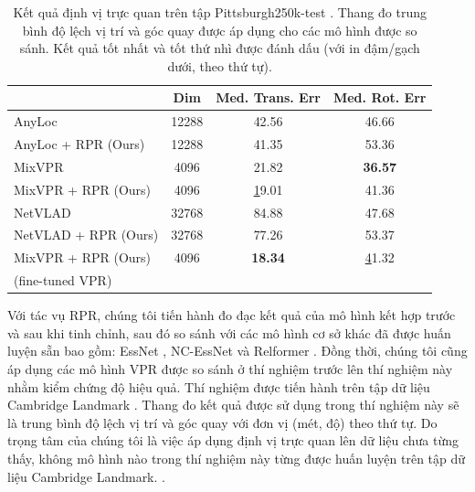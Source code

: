 \bgroup
\def\arraystretch{1.4}%
\setlength\tabcolsep{10 pt}
\begin{table}[H]
\centering
\begin{tabular}{|l|c|c|c|}
\hline
                                & Dim   & Med. Trans. Err & Med. Rot. Err \\ \hline
AnyLoc \cite{keetha2023anyloc}  & 12288 & 42.56           & 46.66         \\
AnyLoc + RPR (Ours)             & 12288 & 41.35           & 53.36         \\ \hline
MixVPR \cite{alibey2023mixvpr}  & 4096  & 21.82           & \textbf{36.57}\\
MixVPR + RPR (Ours)             & 4096  & {\ul 19.01}     & 41.36         \\ \hline
NetVLAD \cite{arandjelovic2016netvlad} & 32768 & 84.88             & 47.68           \\
NetVLAD + RPR (Ours)            & 32768 & 77.26           & 53.37         \\ \hline
MixVPR + RPR (Ours)             & 4096  &\textbf{18.34}   & {\ul 41.32}   \\
(fine-tuned VPR)                &       &                 &               \\ \hline
\end{tabular}
\vspace{10pt}
\caption[Kết quả định vị trực quan trên tập Pittsburgh250k-test]{Kết quả định vị trực quan trên tập Pittsburgh250k-test \cite{6618963}. Thang đo trung bình độ lệch vị trí và góc quay được áp dụng cho các mô hình được so sánh. Kết quả tốt nhất và tốt thứ nhì được đánh dấu (với in đậm/gạch dưới, theo thứ tự).}
\end{table}
\egroup

Với tác vụ RPR, chúng tôi tiến hành đo đạc kết quả của mô hình kết hợp trước và sau khi tinh chỉnh, sau đó so sánh với các mô hình cơ sở khác đã được huấn luyện sẵn bao gồm: EssNet \cite{zhou2020learn}, NC-EssNet \cite{zhou2020learn} và Relformer \cite{idan2023learning}. Đồng thời, chúng tôi cũng áp dụng các mô hình VPR được so sánh ở thí nghiệm trước lên thí nghiệm này nhằm kiểm chứng độ hiệu quả. Thí nghiệm được tiến hành trên tập dữ liệu Cambridge Landmark \cite{kendall2016posenet}. Thang đo kết quả được sử dụng trong thí nghiệm này sẽ là trung bình độ lệch vị trí và góc quay với đơn vị (mét, độ) theo thứ tự. Do trọng tâm của chúng tôi là việc áp dụng định vị trực quan lên dữ liệu chưa từng thấy, không mô hình nào trong thí nghiệm này từng được huấn luyện trên tập dữ liệu Cambridge Landmark. \cite{kendall2016posenet}.

